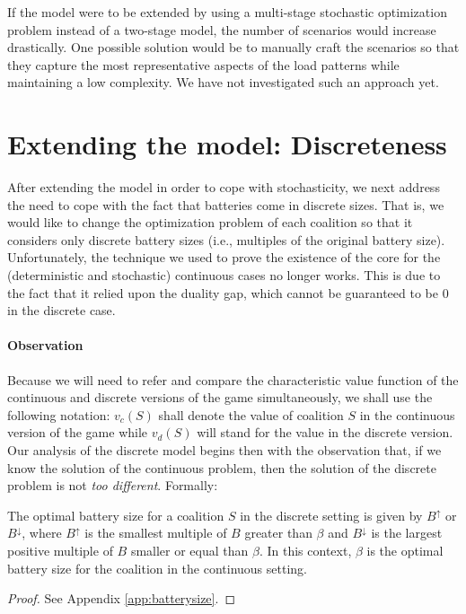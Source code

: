 If the model were to be extended by using a multi-stage stochastic optimization problem instead of a two-stage model, the number of scenarios would increase drastically. One possible solution would be to manually craft the scenarios so that they capture the most representative aspects of the load patterns while maintaining a low complexity. We have not investigated such an approach yet.

\section{Extending the model: Discreteness}

After extending the model in order to cope with stochasticity, we next address the need to cope with the fact that batteries come in discrete sizes. That is, we would like to change the optimization problem of each coalition so that it considers only discrete battery sizes (i.e., multiples of the original battery size).
Unfortunately, the technique we used to prove the existence of the core for the (deterministic and stochastic) continuous cases no longer works. This is due to the fact that it relied upon the duality gap, which cannot be guaranteed to be $0$ in the discrete case.

\paragraph{\textbf{Observation}}
Because we will need to refer and compare the characteristic value function of the continuous and discrete versions of the game simultaneously, we shall use the following notation: $v_c(S)$ shall denote the value of coalition $S$ in the continuous version of the game while $v_d(S)$ will stand for the value in the discrete version.\\

Our analysis of the discrete model begins then with the observation that, if we know the solution of the continuous problem, then the solution of the discrete problem is not \textit{too different}. Formally:

\begin{theorem}\label{th:batterysize_round}
The optimal battery size for a coalition $S$ in the discrete setting is given by $B^{\uparrow}$ or $B^{\downarrow}$, where $B^{\uparrow}$ is the smallest multiple of $B$ greater than $\beta$ and $B^{\downarrow}$ is the largest positive multiple of $B$ smaller or equal than $\beta$. In this context, $\beta$ is the optimal battery size for the coalition in the continuous setting.
\end{theorem}
\begin{proof}

See Appendix \ref{app:batterysize}.
  
\end{proof}

